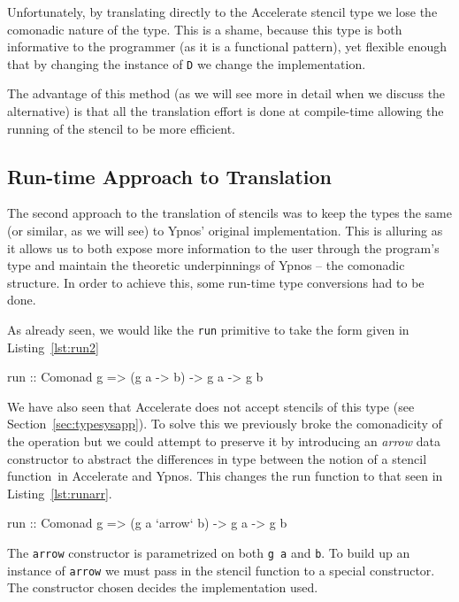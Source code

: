 \documentclass[
    12pt,
    a4paper,
    twoside,
    openright,
    ]{scrbook}
\begin{document}
Unfortunately, by translating directly to the Accelerate stencil type we lose
the comonadic nature of the type. This is a shame, because this type is both
informative to the programmer (as it is a functional pattern), yet flexible
enough that by changing the instance of \texttt{D} we change the implementation.

The advantage of this method (as we will see more in detail when we discuss the
alternative) is that all the translation effort is done at compile-time allowing
the running of the stencil to be more efficient.

\subsection{Run-time Approach to Translation}
\label{sec:runtimetrans}

The second approach to the translation of stencils was to keep the types the
same (or similar, as we will see) to Ypnos' original implementation.  This is
alluring as it allows us to both expose more information to the user through the
program's type and maintain the theoretic underpinnings of Ypnos -- the
comonadic structure. In order to achieve this, some run-time type conversions
had to be done.

As already seen, we would like the \texttt{run} primitive to take the
form given in Listing~\ref{lst:run2}

\begin{hflisting}[label={lst:run2}, caption=The comonadic run type. Changing the
  type of \texttt{g} could change the backend used.]
run :: Comonad g => (g a -> b) -> g a -> g b
\end{hflisting}

We have also seen that Accelerate does not accept stencils of this type (see
Section~\ref{sec:typesysapp}).  To solve this we previously broke the
comonadicity of the operation but we could attempt to preserve it by introducing
an \emph{arrow} data constructor to abstract the differences in type between the
notion of a stencil function\ in Accelerate and Ypnos. This changes the run
function to that seen in Listing~\ref{lst:runarr}.

\begin{hflisting}[label={lst:runarr}, caption=The type run is generalised to
  using the \texttt{arrow} type.]
run :: Comonad g => (g a `arrow` b) -> g a -> g b
\end{hflisting}

The \texttt{arrow} constructor is parametrized on both \texttt{g a} and
\texttt{b}. To build up an instance of \texttt{arrow} we must pass in the
stencil function to a special constructor. The constructor chosen decides the
implementation used.
\end{document}
